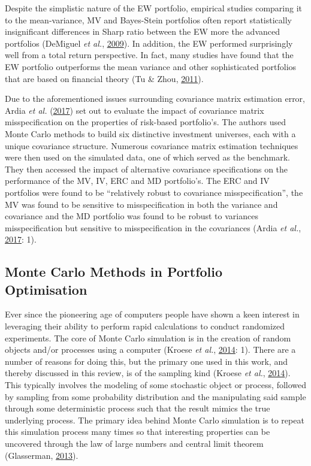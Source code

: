 \documentclass[11pt,preprint, authoryear]{elsarticle}
\numberwithin{equation}{section}
\numberwithin{figure}{section}
\numberwithin{table}{section}
\begin{document}
Despite the simplistic nature of the EW portfolio, empirical studies
comparing it to the mean-variance, MV and Bayes-Stein portfolios often
report statistically insignificant differences in Sharp ratio between
the EW more the advanced portfolios (DeMiguel \emph{et al.},
\protect\hyperlink{ref-demiguel2009}{2009}). In addition, the EW
performed surprisingly well from a total return perspective. In fact,
many studies have found that the EW portfolio outperforms the mean
variance and other sophisticated portfolios that are based on financial
theory (Tu \& Zhou, \protect\hyperlink{ref-tu2011}{2011}).

Due to the aforementioned issues surrounding covariance matrix
estimation error, Ardia \emph{et al.}
(\protect\hyperlink{ref-ardia2017}{2017}) set out to evaluate the impact
of covariance matrix misspecification on the properties of risk-based
portfolio's. The authors used Monte Carlo methods to build six
distinctive investment universes, each with a unique covariance
structure. Numerous covariance matrix estimation techniques were then
used on the simulated data, one of which served as the benchmark. They
then accessed the impact of alternative covariance specifications on the
performance of the MV, IV, ERC and MD portfolio's. The ERC and IV
portfolios were found to be ``relatively robust to covariance
misspecification'', the MV was found to be sensitive to misspecification
in both the variance and covariance and the MD portfolio was found to be
robust to variances misspecification but sensitive to misspecification
in the covariances (Ardia \emph{et al.},
\protect\hyperlink{ref-ardia2017}{2017}: 1).

\hypertarget{monte-carlo-methods-in-portfolio-optimisation}{%
\subsection{Monte Carlo Methods in Portfolio
Optimisation}\label{monte-carlo-methods-in-portfolio-optimisation}}

Ever since the pioneering age of computers people have shown a keen
interest in leveraging their ability to perform rapid calculations to
conduct randomized experiments. The core of Monte Carlo simulation is in
the creation of random objects and/or processes using a computer (Kroese
\emph{et al.}, \protect\hyperlink{ref-kroese2014}{2014}: 1). There are a
number of reasons for doing this, but the primary one used in this work,
and thereby discussed in this review, is of the sampling kind (Kroese
\emph{et al.}, \protect\hyperlink{ref-kroese2014}{2014}). This typically
involves the modeling of some stochastic object or process, followed by
sampling from some probability distribution and the manipulating said
sample through some deterministic process such that the result mimics
the true underlying process. The primary idea behind Monte Carlo
simulation is to repeat this simulation process many times so that
interesting properties can be uncovered through the law of large numbers
and central limit theorem (Glasserman,
\protect\hyperlink{ref-glasserman2013}{2013}).
\end{document}
